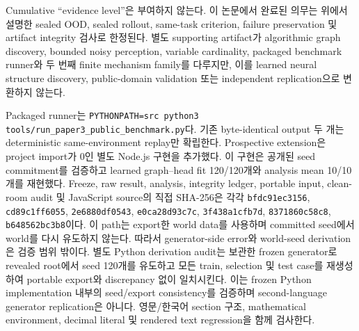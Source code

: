 Cumulative ``evidence level''은 부여하지 않는다. 이 논문에서 완료된 의무는 위에서
설명한 sealed OOD, sealed rollout, same-task criterion, failure preservation 및
artifact integrity 검사로 한정된다. 별도 supporting artifact가 algorithmic graph
discovery, bounded noisy perception, variable cardinality, packaged benchmark
runner와 두 번째 finite mechanism family를 다루지만, 이를 learned neural
structure discovery, public-domain validation 또는 independent replication으로
변환하지 않는다.

Packaged runner는 \texttt{PYTHONPATH=src python3}
\texttt{tools/run\_paper3\_public\_benchmark.py}다.
기존 byte-identical output 두 개는 deterministic same-environment replay만
확립한다. Prospective extension은 project import가 0인 별도 Node.js 구현을
추가했다. 이 구현은 공개된 seed commitment를 검증하고 learned graph--head fit
120/120개와 analysis mean 10/10개를 재현했다. Freeze, raw result, analysis,
integrity ledger, portable input, clean-room audit 및 JavaScript source의 직접
SHA-256은 각각 \texttt{bfdc91ec3156}, \texttt{cd89c1ff6055},
\texttt{2e6880df0543}, \texttt{e0ca28d93c7c}, \texttt{3f438a1cfb7d},
\texttt{8371860c58c8}, \texttt{b648562bc3b8}이다. 이 path는 export한 world data를
사용하며 committed seed에서 world를 다시 유도하지 않는다. 따라서 generator-side
error와 world-seed derivation은 검증 범위 밖이다. 별도 Python derivation audit는
보관한 frozen generator로 revealed root에서 seed 120개를 유도하고 모든 train,
selection 및 test case를 재생성하여 portable export와 discrepancy 없이 일치시킨다.
이는 frozen Python implementation 내부의 seed/export consistency를 검증하며
second-language generator replication은 아니다. 영문/한국어 section 구조,
mathematical environment, decimal literal 및 rendered text regression을 함께
검사한다.
